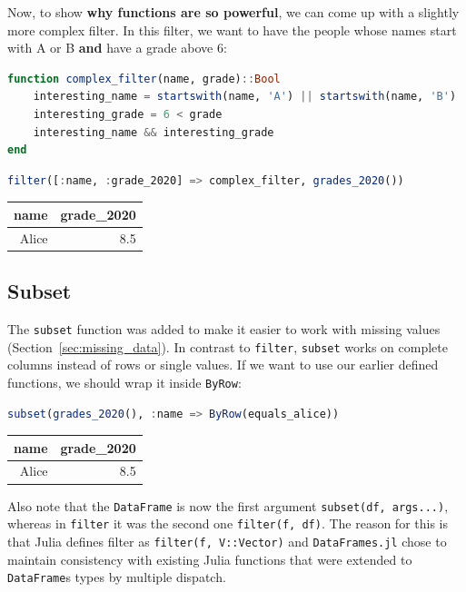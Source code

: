 \documentclass[
  notoc %
]{tufte-book}
\newcommand{\passthrough}[1]{#1}
\begin{document}
Now, to show \textbf{why functions are so powerful}, we can come up with
a slightly more complex filter. In this filter, we want to have the
people whose names start with A or B \textbf{and} have a grade above 6:

\begin{lstlisting}[language=Julia]
function complex_filter(name, grade)::Bool
    interesting_name = startswith(name, 'A') || startswith(name, 'B')
    interesting_grade = 6 < grade
    interesting_name && interesting_grade
end
\end{lstlisting}

\begin{lstlisting}[language=Julia]
filter([:name, :grade_2020] => complex_filter, grades_2020())
\end{lstlisting}

\begin{longtable}[]{@{}rr@{}}
\toprule
name & grade\_2020 \\
\midrule
\endhead
Alice & 8.5 \\
\bottomrule
\end{longtable}

\hypertarget{sec:subset}{%
\subsection{Subset}\label{sec:subset}}

The \passthrough{\lstinline!subset!} function was added to make it
easier to work with missing values (Section~\ref{sec:missing_data}). In
contrast to \passthrough{\lstinline!filter!},
\passthrough{\lstinline!subset!} works on complete columns instead of
rows or single values. If we want to use our earlier defined functions,
we should wrap it inside \passthrough{\lstinline!ByRow!}:

\begin{lstlisting}[language=Julia]
subset(grades_2020(), :name => ByRow(equals_alice))
\end{lstlisting}

\begin{longtable}[]{@{}rr@{}}
\toprule
name & grade\_2020 \\
\midrule
\endhead
Alice & 8.5 \\
\bottomrule
\end{longtable}

Also note that the \passthrough{\lstinline!DataFrame!} is now the first
argument \passthrough{\lstinline!subset(df, args...)!}, whereas in
\passthrough{\lstinline!filter!} it was the second one
\passthrough{\lstinline!filter(f, df)!}. The reason for this is that
Julia defines filter as \passthrough{\lstinline!filter(f, V::Vector)!}
and \passthrough{\lstinline!DataFrames.jl!} chose to maintain
consistency with existing Julia functions that were extended to
\passthrough{\lstinline!DataFrame!}s types by multiple dispatch.
\end{document}
